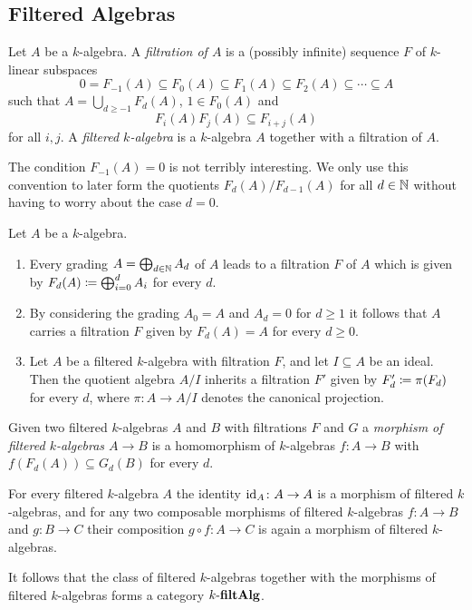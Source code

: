 \subsection{Filtered Algebras}


\begin{definition}
  Let $A$ be a $k$-algebra.
  A \emph{filtration of $A$} is a (possibly infinite) sequence $F$ of $k$-linear subspaces
  \[
              0
    =         F_{-1}(A)
    \subseteq F_0(A)
    \subseteq F_1(A)
    \subseteq F_2(A)
    \subseteq \dotsb
    \subseteq A
  \]
  such that $A = \bigcup_{d \geq -1} F_d(A)$, $1 \in F_0(A)$ and
  \[
              F_i(A) F_j(A)
    \subseteq F_{i+j}(A)
  \]
  for all $i, j$.
  A \emph{filtered $k$-algebra} is a $k$-algebra $A$ together with a filtration of $A$.
\end{definition}


\begin{remark}
  The condition $F_{-1}(A) = 0$ is not terribly interesting.
  We only use this convention to later form the quotients $F_d(A) / F_{d-1}(A)$ for all $d \in \mathbb{N}$ without having to worry about the case $d = 0$.
\end{remark}


\begin{example}
  Let $A$ be a $k$-algebra.
  \begin{enumerate}
    \item
      \label{enumerate: grading leads to filtration}
      Every grading $A = \bigoplus_{d \in \mathbb{N}} A_d$ of $A$ leads to a filtration $F$ of $A$ which is given by $F_d(A) \coloneqq \bigoplus_{i=0}^d A_i$ for every $d$.
    \item
      By considering the grading $A_0 = A$ and $A_d = 0$ for $d \geq 1$ it follows that $A$ carries a filtration $F$ given by $F_d(A) = A$ for every $d \geq 0$.
    \item
      Let $A$ be a filtered $k$-algebra with filtration $F$, and let $I \subseteq A$ be an ideal.
      Then the quotient algebra $A/I$ inherits a filtration $F'$ given by $F'_d \coloneqq \pi(F_d)$ for every $d$, where $\pi \colon A \to A/I$ denotes the canonical projection.
  \end{enumerate}
\end{example}


\begin{remark}
  Given two filtered $k$-algebras $A$ and $B$ with filtrations $F$ and $G$ a \emph{morphism of filtered $k$-algebras $A \to B$} is a homomorphism of $k$-algebras $f \colon A \to B$ with $f(F_d(A)) \subseteq G_d(B)$ for every $d$.
  
  For every filtered $k$-algebra $A$ the identity $\operatorname{id}_A \colon A \to A$ is a morphism of filtered $k$-algebras, and for any two composable morphisms of filtered $k$-algebras $f \colon A \to B$ and $g \colon B \to C$ their composition $g \circ f \colon A \to C$ is again a morphism of filtered $k$-algebras.
  
  It follows that the class of filtered $k$-algebras together with the morphisms of filtered $k$-algebras forms a category $k\text{-}\mathbf{filtAlg}$.
\end{remark}



